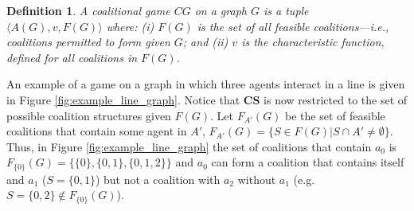 \documentclass{aamas2012}
\newtheorem{definition}{Definition}
\begin{document}
\begin{definition}
A coalitional game $CG$ on a graph $G$ is a tuple $\langle A(G), v,
F(G)\rangle$ where: 
(i) $F(G)$ is the set of all {\em feasible} coalitions---i.e., coalitions permitted to form given $G$; and
(ii) $v$ is the characteristic function, defined for all coalitions in $F(G)$.
\end{definition}
An example of a game on a graph in
which three agents interact in a line is given in Figure
\ref{fig:example_line_graph}. 
Notice that $\mathbf{CS}$ is now restricted
 to the set of possible coalition structures given $F(G)$.
 Let $F_{A'}(G)$ be the set of feasible coalitions that contain some agent in
 $A'$, $F_{A'}(G)=\{S\in F(G)\vert S\cap A' \neq
 \emptyset\}$. Thus, in Figure \ref{fig:example_line_graph}
 the set of coalitions that contain $a_0$ is
 $F_{\{0\}}(G)=\{\{0\},\{0,1\},\{0,1,2\}\}$ and $a_0$ can form a coalition that
 contains itself and $a_1$ ($S=\{0,1\}$) but not a coalition with $a_2$ without
 $a_1$ (e.g. $S=\{0,2\} \not \in F_{\{0\}}(G)$).
 





\end{document}
